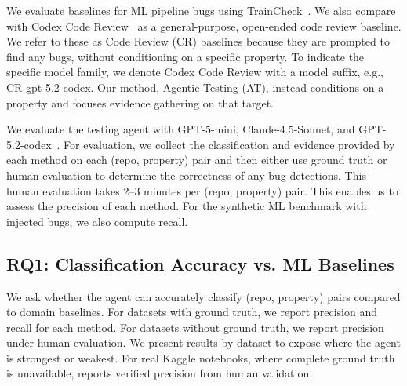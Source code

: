 \documentclass[11pt]{article}
\begin{document}
We evaluate baselines for ML pipeline bugs using TrainCheck~\citep{traincheck}.
We also compare with Codex Code Review~\citep{openai_codex} as a general-purpose, open-ended code review baseline.
We refer to these as Code Review (CR) baselines because they are prompted to find any bugs, without conditioning on a specific property.
To indicate the specific model family, we denote Codex Code Review with a model suffix, e.g., CR-gpt-5.2-codex.
Our method, Agentic Testing (AT), instead conditions on a property and focuses evidence gathering on that target.

We evaluate the testing agent with GPT-5-mini, Claude-4.5-Sonnet, and GPT-5.2-codex~\citep{openai_codex_models,openai_gpt52,openai_gpt52_codex,anthropic_models}.
For evaluation, we collect the classification and evidence provided by each method on each (repo, property) pair and then either use ground truth or human evaluation to determine the correctness of any bug detections.
This human evaluation takes 2--3 minutes per (repo, property) pair.
This enables us to assess the precision of each method.
For the synthetic ML benchmark with injected bugs, we also compute recall.

\subsection{RQ1: Classification Accuracy vs. ML Baselines}
We ask whether the agent can accurately classify (repo, property) pairs compared to domain baselines.
For datasets with ground truth, we report precision and recall for each method.
For datasets without ground truth, we report precision under human evaluation.
We present results by dataset to expose where the agent is strongest or weakest.
For real Kaggle notebooks, where complete ground truth is unavailable,  reports verified precision from human validation.
\end{document}
